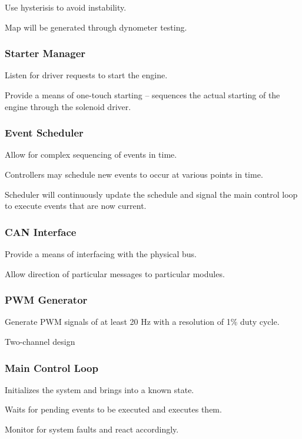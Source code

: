 Use hysterisis to avoid instability.

Map will be generated through dynometer testing.


\subsubsection{Starter Manager}

Listen for driver requests to start the engine.

Provide a means of one-touch starting -- sequences the actual starting of the engine through the solenoid driver. 


\subsubsection{Event Scheduler}

Allow for complex sequencing of events in time.

Controllers may schedule new events to occur at various points in time.

Scheduler will continuously update the schedule and signal the main control loop to execute events that are now current.


\subsubsection{CAN Interface}

Provide a means of interfacing with the physical bus. 

Allow direction of particular messages to particular modules.


\subsubsection{PWM Generator}

Generate PWM signals of at least 20 Hz with a resolution of 1\% duty
cycle.

Two-channel design


\subsubsection{Main Control Loop}

Initializes the system and brings into a known state.

Waits for pending events to be executed and executes them.

Monitor for system faults and react accordingly.

